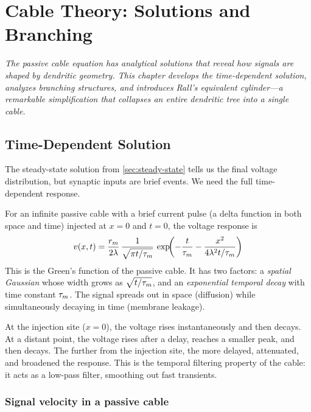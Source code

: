 \chapter{Cable Theory: Solutions and Branching}
\label{ch:cable-branching}

\textit{The passive cable equation has analytical solutions that reveal how signals are shaped by dendritic geometry. This chapter develops the time-dependent solution, analyzes branching structures, and introduces Rall's equivalent cylinder---a remarkable simplification that collapses an entire dendritic tree into a single cable.}

\section{Time-Dependent Solution}
\label{sec:time-dependent}

The steady-state solution from \cref{sec:steady-state} tells us the final voltage distribution, but synaptic inputs are brief events. We need the full time-dependent response.

For an infinite passive cable with a brief current pulse (a delta function in both space and time) injected at $x = 0$ and $t = 0$, the voltage response is
%
\begin{equation}
  v(x, t) = \frac{r_m}{2\lambda}\,\frac{1}{\sqrt{\pi t/\tau_m}}\,
    \exp\!\biggl(-\frac{t}{\tau_m} - \frac{x^2}{4\lambda^2 t/\tau_m}\biggr)
  \label{eq:cable-greens}
\end{equation}
%
This is the Green's function of the passive cable. It has two factors: a \emph{spatial Gaussian} whose width grows as $\sqrt{t/\tau_m}$, and an \emph{exponential temporal decay} with time constant $\tau_m$. The signal spreads out in space (diffusion) while simultaneously decaying in time (membrane leakage).

At the injection site ($x = 0$), the voltage rises instantaneously and then decays. At a distant point, the voltage rises after a delay, reaches a smaller peak, and then decays. The further from the injection site, the more delayed, attenuated, and broadened the response. This is the temporal filtering property of the cable: it acts as a low-pass filter, smoothing out fast transients.

\subsection{Signal velocity in a passive cable}

